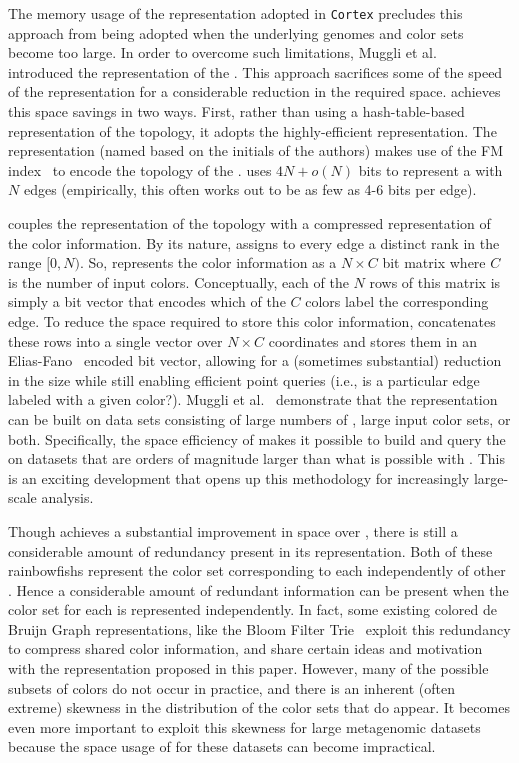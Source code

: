 The memory usage of the \cdbg representation adopted in \texttt{Cortex}
precludes this approach from being adopted when the underlying genomes and color
sets become too large. In order to overcome such limitations, Muggli et
al.~\cite{MuggliBoNo17} introduced the \vari representation of the \cdbg. This
approach sacrifices some of the speed of the \cortex representation for a
considerable reduction in the required space. \vari achieves this space savings
in two ways.  First, rather than using a hash-table-based representation of the
\dbg topology, it adopts the highly-efficient \boss representation. The
\boss~\cite{BoweOn12} representation (named based on the initials of the
authors) makes use of the FM index~\cite{FerraginaMa00} to encode the topology
of the \dbg. \boss uses $4N + o(N)$ bits to represent a \dbg with $N$ edges
(empirically, this often works out to be as few as 4-6 bits per edge).

\vari couples the \boss representation of the \dbg topology with a compressed
representation of the color information. By its nature, \boss assigns to every
\dbg edge a distinct rank in the range $[0,N)$. So, \vari represents the color
  information as a $N \times C$ bit matrix where $C$ is the number of input colors.
  Conceptually, each of the $N$ rows of this matrix is simply a bit vector that
  encodes which of the $C$ colors label the corresponding edge. To reduce the
  space required to store this color information, \vari concatenates these rows
  into a single vector over $N \times C$ coordinates and stores them in an
  Elias-Fano~\cite{Elias74, Fano71} encoded bit vector, allowing for a
  (sometimes substantial) reduction in the size while still enabling efficient
  point queries (i.e., is a particular edge labeled with a given color?).
  Muggli et al.~\cite{MuggliBoNo17} demonstrate that the \vari representation
  can be built on data sets consisting of large numbers of \kmers, large input
  color sets, or both.  Specifically, the space efficiency of \vari makes it
  possible to build and query the \cdbg on datasets that are orders of magnitude
  larger than what is possible with \cortex.  This is an exciting development
  that opens up this methodology for increasingly large-scale analysis.

  Though \vari achieves a substantial improvement in space over \cortex, there
  is still a considerable amount of redundancy present in its representation.
  Both of these rainbowfishs represent the color set corresponding to each \kmer
  independently of other \kmers. Hence a considerable amount of redundant
  information can be present when the color set for each \kmer is represented
  independently. In fact, some existing colored de Bruijn Graph representations,
  like the Bloom Filter Trie~\cite{holley2016bloom} exploit this redundancy to
  compress shared color information, and share certain ideas and motivation with
  the representation proposed in this paper. However, many of the possible
  subsets of colors do not occur in practice, and there is an inherent (often
  extreme) skewness in the distribution of the color sets that do appear. It
  becomes even more important to exploit this skewness for large metagenomic
  datasets because the space usage of \vari for these datasets can become
  impractical.

